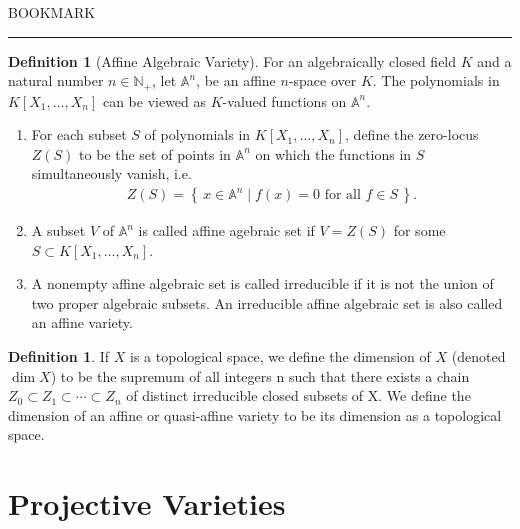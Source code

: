 \documentclass[11pt]{book}
\theoremstyle{definition}
\newtheorem{definition}[theorem]{Definition}
\numberwithin{equation}{section}
\newcommand{\makeset}[2]{\left\{\, #1 \mathrel{\mid} #2 \,\right\}}
\begin{document}
BOOKMARK
\newline
\rule{\textwidth}{0.4pt}
\newline
\newpage
\begin{defbox}
    \begin{definition}[Affine Algebraic Variety]
        For an algebraically closed field \(K\) and a natural number \(n \in \mathbb{N}_+\), let \(\mathbb{A}^n\), be an affine \(n\)-space over \(K\). The polynomials in \(K[X_1, \ldots, X_n]\) can be viewed as \(K\)-valued functions on \(\mathbb{A}^n\).
        \begin{enumerate}
            \item For each subset \(S\) of polynomials in \(K[X_1, \ldots, X_n]\), define the zero-locus \(Z(S)\) to be the set of points in \(\mathbb{A}^n\) on which the functions in \(S\) simultaneously vanish, i.e.
            \begin{align*}
                Z(S) = \makeset{x \in \mathbb{A}^n}{f(x) = 0 \text{ for all } f \in S} \text{.}
            \end{align*}
            \item A subset \(V\) of \(\mathbb{A}^n\) is called affine agebraic set if \(V = Z(S)\) for some \(S \subset K[X_1, \ldots, X_n]\).
            \item A nonempty affine algebraic set is called irreducible if it is not the union of two proper algebraic subsets. An irreducible affine algebraic set is also called an affine variety.
        \end{enumerate}
    \end{definition}
\end{defbox}



\begin{defbox}
    \begin{definition}
        \label{def:dimension_topological_space}
        If \(X\) is a topological space, we define the dimension of \(X\) (denoted
        \(\dim  X\)) to be the supremum of all integers n such that there exists a chain \(Z_0 \subset Z_1 \subset \cdots \subset Z_n\) of distinct irreducible closed subsets of X. We define the dimension of an affine or quasi-affine variety to be its dimension as a topological space. 
    \end{definition}
\end{defbox}



\chapter{Projective Varieties}
\end{document}

